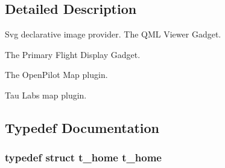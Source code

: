 \subsection{\-Detailed \-Description}
\-Svg declarative image provider. \-The \-Q\-M\-L \-Viewer \-Gadget.

\-The \-Primary \-Flight \-Display \-Gadget.

\-The \-Open\-Pilot \-Map plugin.

\-Tau \-Labs map plugin. 

\subsection{\-Typedef \-Documentation}
\hypertarget{group___o_p_map_plugin_ga11ae47f39c6685b33aac90d5bc1ce28f}{
\subsubsection[{t\-\_\-home}]{\setlength{\rightskip}{0pt plus 5cm}typedef struct {\bf t\-\_\-home}  {\bf t\-\_\-home}}}\label{group___o_p_map_plugin_ga11ae47f39c6685b33aac90d5bc1ce28f}


